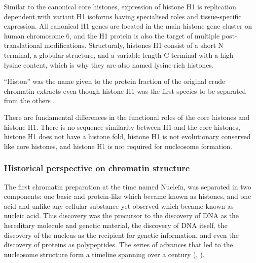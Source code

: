       Similar to the canonical core histones, expression of histone H1 is
      replication dependent with variant H1 isoforms having specialised
      roles and tissue-specific expression.  All canonical H1 genes
      are located in the main histone gene cluster on human
      chromosome 6, and the H1 protein
      is also the target of multiple post-translational modifications.
      Structuraly, histones H1 consist of a short N terminal, a globular
      structure, and a variable length C terminal with a high lysine
      content, which is why they are also named lysine-rich histones.

      ``Histon'' was the name given to the protein fraction of
      the original crude chromatin extracts \citep{kossel1884-histones}
      even though histone H1 was the first species to be separated from
      the others \citep{stedman1951main-histones-separation}.

      There are fundamental differences in the functional roles of
      the core histones and histone H1.
      There is no sequence similarity between H1 and the core histones,
      histone H1 does not have a histone fold,
      histone H1 is not evolutionary conserved like core histones,
      and histone H1 is not required for nucleosome formation.

    \subsubsection{Historical perspective on chromatin structure}

      The first chromatin preparation \citep{kossel1884-histones}
      at the time named Nucleïn, was
      separated in two components: one basic and protein-like which
      became known as histones, and one acid and unlike any cellular
      substance yet observed which became known as nucleic acid.
      This discovery was the precursor to the discovery of DNA as the hereditary
      molecule and genetic material, the discovery of DNA itself,
      the discovery of the nucleus as the recipient for genetic
      information, and even the discovery of proteins as polypeptides.
      The series of advances that led to the nucleosome
      structure form a timeline spanning over a century
      (,
      \cite{vanHolde-chapter1}).

